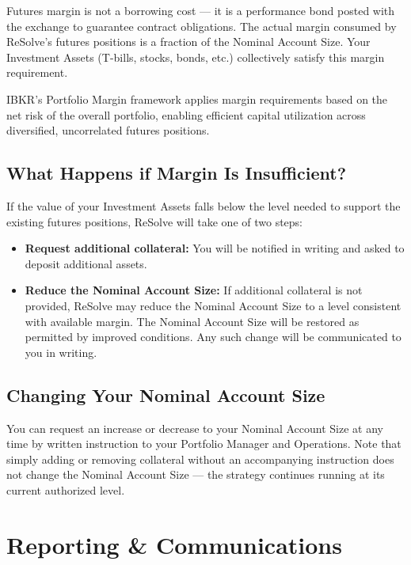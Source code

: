 \documentclass{resolve-whitepaper}
\providecommand{\tightlist}{%
  \setlength{\itemsep}{0pt}\setlength{\parskip}{0pt}}
\begin{document}
Futures margin is not a borrowing cost --- it is a performance bond
posted with the exchange to guarantee contract obligations. The actual
margin consumed by ReSolve's futures positions is a fraction of the
Nominal Account Size. Your Investment Assets (T-bills, stocks, bonds,
etc.) collectively satisfy this margin requirement.

IBKR's Portfolio Margin framework applies margin requirements based on
the net risk of the overall portfolio, enabling efficient capital
utilization across diversified, uncorrelated futures positions.

\subsection{What Happens if Margin Is
Insufficient?}\label{what-happens-if-margin-is-insufficient}

If the value of your Investment Assets falls below the level needed to
support the existing futures positions, ReSolve will take one of two
steps:

\begin{itemize}
\tightlist
\item
  \textbf{Request additional collateral:} You will be notified in
  writing and asked to deposit additional assets.
\item
  \textbf{Reduce the Nominal Account Size:} If additional collateral is
  not provided, ReSolve may reduce the Nominal Account Size to a level
  consistent with available margin. The Nominal Account Size will be
  restored as permitted by improved conditions. Any such change will be
  communicated to you in writing.
\end{itemize}

\subsection{Changing Your Nominal Account
Size}\label{changing-your-nominal-account-size}

You can request an increase or decrease to your Nominal Account Size at
any time by written instruction to your Portfolio Manager and
Operations. Note that simply adding or removing collateral without an
accompanying instruction does not change the Nominal Account Size ---
the strategy continues running at its current authorized level.

\sectionpagebreak

\section{Reporting \& Communications}\label{reporting-communications}
\end{document}
